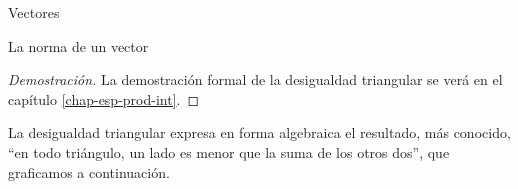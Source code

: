 \begin{chapter}{Vectores}
\begin{section}{La norma de un vector}
\begin{proof}[Demostración]
La demostración formal de la desigualdad triangular se verá en el capítulo \ref{chap-esp-prod-int}. 
\begin{comment}
   Sea $v= (x_1,\ldots,x_n)$ y $w = (y_1,,\ldots,y_n)$. Luego $v+w = (x_1+ y_1,\ldots, x_n + y_n)$. Debemos probar entonces que
    \begin{equation*}
    \sqrt{\sum (x_i+ y_i)^2} \le  \sqrt{\sum x_i^2} + \sqrt{\sum y_i^2},
    \end{equation*}
    (todas las sumatoria sobre $i$). Si elevamos al cuadrado obtenemos:
    \begin{align*}
        \sum (x_i+ y_i)^2 &\le\sum x_i^2  + \sum y_i^2+ 2\sqrt{\sum x_i^2}\sqrt{\sum y_i^2}\\
        &\Updownarrow\\
        \sum  x_i^2+ y_i^2 + 2x_iy_i &\le \sum  x_i^2+ y_i^2 + 2\sqrt{\sum x_i^2}\sqrt{\sum y_i^2}\\
        &\Updownarrow\\
        \sum x_iy_i &\le \sqrt{\sum x_i^2}\sqrt{\sum y_i^2}.
    \end{align*}
    Si elevamos al cuadrado de nuevo obtenemos que
    \begin{equation*}
        ||v+w|| \le ||v||+||w|| \quad \Leftrightarrow \quad   (\sum x_iy_i)^2 \le \sum x_i^2\sum y_i^2.
    \end{equation*}

    Ahora bien
    \begin{align*}
        (\sum_i x_iy_i)^2  &= \sum_{i,j} x_iy_ix_jy_j \\
        &= \sum_i   x_iy_i x_iy_i + \sum_{i \ne j}  x_iy_ix_jy_j \\
        &= \sum_i   x_i^2y_i^2  +2 \sum_{i < j}  x_iy_ix_jy_j
    \end{align*}
\end{comment} 
\end{proof}

La desigualdad triangular expresa en forma algebraica el resultado, más conocido, ``en todo triángulo, un lado es menor que la suma de los otros dos'', que graficamos a continuación.


\end{section}
\end{chapter}
